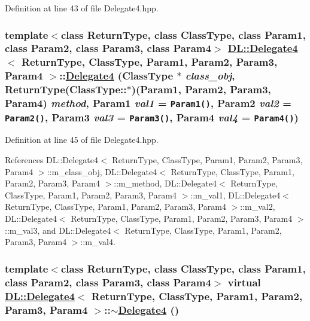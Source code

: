 Definition at line 43 of file Delegate4.hpp.\hypertarget{classDL_1_1Delegate4_a0}{
\subsubsection[Delegate4]{\setlength{\rightskip}{0pt plus 5cm}template$<$class Return\-Type, class Class\-Type, class Param1, class Param2, class Param3, class Param4$>$ \hyperlink{classDL_1_1Delegate4}{DL::Delegate4}$<$ Return\-Type, Class\-Type, Param1, Param2, Param3, Param4 $>$::\hyperlink{classDL_1_1Delegate4}{Delegate4} (Class\-Type $\ast$ {\em class\_\-obj}, Return\-Type(Class\-Type::$\ast$)(Param1, Param2, Param3, Param4) {\em method}, Param1 {\em val1} = {\tt Param1()}, Param2 {\em val2} = {\tt Param2()}, Param3 {\em val3} = {\tt Param3()}, Param4 {\em val4} = {\tt Param4()})}}
\label{classDL_1_1Delegate4_a0}




Definition at line 45 of file Delegate4.hpp.

References DL::Delegate4$<$ Return\-Type, Class\-Type, Param1, Param2, Param3, Param4 $>$::m\_\-class\_\-obj, DL::Delegate4$<$ Return\-Type, Class\-Type, Param1, Param2, Param3, Param4 $>$::m\_\-method, DL::Delegate4$<$ Return\-Type, Class\-Type, Param1, Param2, Param3, Param4 $>$::m\_\-val1, DL::Delegate4$<$ Return\-Type, Class\-Type, Param1, Param2, Param3, Param4 $>$::m\_\-val2, DL::Delegate4$<$ Return\-Type, Class\-Type, Param1, Param2, Param3, Param4 $>$::m\_\-val3, and DL::Delegate4$<$ Return\-Type, Class\-Type, Param1, Param2, Param3, Param4 $>$::m\_\-val4.\hypertarget{classDL_1_1Delegate4_a1}{
\subsubsection[$\sim$Delegate4]{\setlength{\rightskip}{0pt plus 5cm}template$<$class Return\-Type, class Class\-Type, class Param1, class Param2, class Param3, class Param4$>$ virtual \hyperlink{classDL_1_1Delegate4}{DL::Delegate4}$<$ Return\-Type, Class\-Type, Param1, Param2, Param3, Param4 $>$::$\sim$\hyperlink{classDL_1_1Delegate4}{Delegate4} ()}}
\label{classDL_1_1Delegate4_a1}




